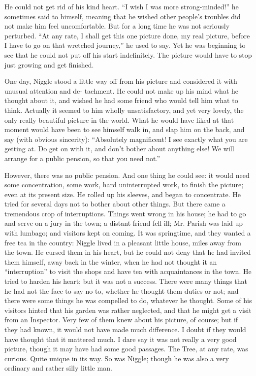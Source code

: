 \documentclass[english]{scrartcl}
\begin{document}
He could not get rid of his kind heart. “I wish I was more strong-minded!” he sometimes said to himself, meaning that he wished other people’s troubles did not make him feel uncomfortable. But for a long time he was not seriously perturbed. “At any rate, I shall get this one picture done, my real picture, before I have to go on that wretched journey,” he used to say. Yet he was beginning to see that he could not put off his start indefinitely. The picture would have to stop just growing and get finished.

One day, Niggle stood a little way off from his picture and considered it with unusual attention and de- tachment. He could not make up his mind what he thought about it, and wished he had some friend who would tell him what to think. Actually it seemed to him wholly unsatisfactory, and yet very lovely, the only really beautiful picture in the world. What he would have liked at that moment would have been to see himself walk in, and slap him on the back, and say (with obvious sincerity): “Absolutely magnificent! I see exactly what you are getting at. Do get on with it, and don’t bother about anything else! We will arrange for a public pension, so that you need not.”

However, there was no public pension. And one thing he could see: it would need some concentration, some work, hard uninterrupted work, to finish the picture; even at its present size. He rolled up his sleeves, and began to concentrate. He tried for several days not to bother about other things. But there came a tremendous crop of interruptions. Things went wrong in his house; he had to go and serve on a jury in the town; a distant friend fell ill; Mr. Parish was laid up with lumbago; and visitors kept on coming. It was springtime, and they wanted a free tea in the country: Niggle lived in a pleasant little house, miles away from the town. He cursed them in his heart, but he could not deny that he had invited them himself, away back in the winter, when he had not thought it an “interruption” to visit the shops and have tea with acquaintances in the town. He tried to harden his heart; but it was not a success. There were many things that he had not the face to say no to, whether he thought them duties or not; and there were some things he was compelled to do, whatever he thought. Some of his visitors hinted that his garden was rather neglected, and that he might get a visit from an Inspector. Very few of them knew about his picture, of course; but if they had known, it would not have made much difference. I doubt if they would have thought that it mattered much. I dare say it was not really a very good picture, though it may have had some good passages. The Tree, at any rate, was curious. Quite unique in its way. So was Niggle; though he was also a very ordinary and rather silly little man.
\end{document}
